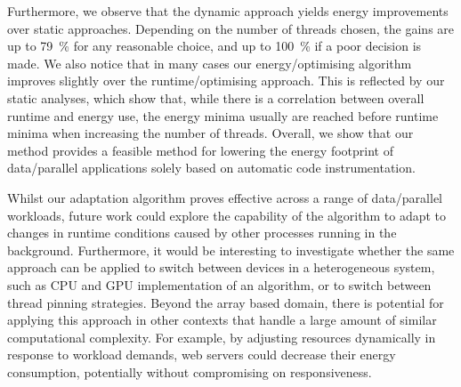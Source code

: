 Furthermore, we observe that the dynamic approach yields energy improvements over static approaches.
Depending on the number of threads chosen, the gains are up to \qty{79}{\percent} for any reasonable choice, and up to \qty{100}{\percent} if a poor decision is made.
We also notice that in many cases our energy\-/optimising algorithm improves slightly over the runtime\-/optimising approach.
This is reflected by our static analyses, which show that, while there is a correlation between overall runtime and energy use, the energy minima usually are reached before runtime minima when increasing the number of threads.
Overall, we show that our method provides a feasible method for lowering the energy footprint of data\-/parallel applications solely based on automatic code instrumentation.

Whilst our adaptation algorithm proves effective across a range of data\-/parallel workloads, future work could explore the capability of the algorithm to adapt to changes in runtime conditions caused by other processes running in the background.
Furthermore, it would be interesting to investigate whether the same approach can be applied to switch between devices in a heterogeneous system, such as CPU and GPU implementation of an algorithm, or to switch between thread pinning strategies.
Beyond the array based domain, there is potential for applying this approach in other contexts that handle a large amount of similar computational complexity.
For example, by adjusting resources dynamically in response to workload demands, web servers could decrease their energy consumption, potentially without compromising on responsiveness.
